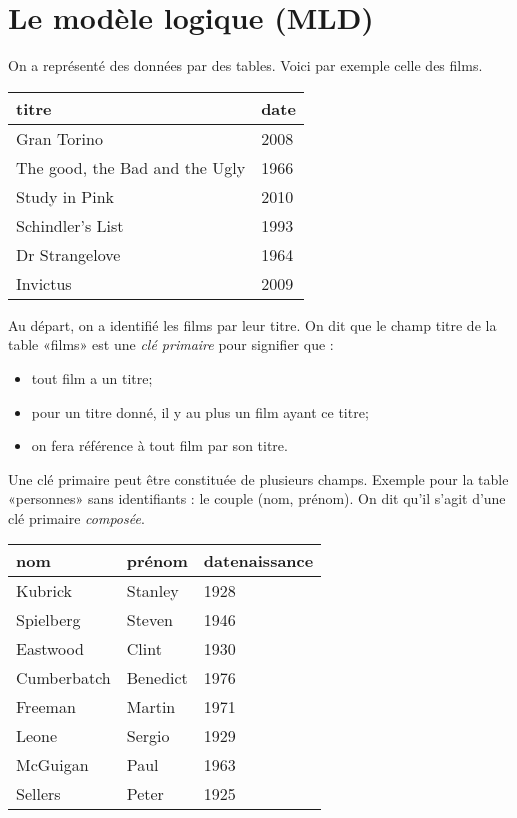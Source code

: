 \section{Le modèle logique (MLD)}

On a représenté des données par des tables. Voici par exemple celle des films.
\begin{center}
\begin{tabular}{ll}
\toprule
  titre & date\\
\midrule
  Gran Torino & 2008\\
  The good, the Bad and the Ugly& 1966\\
  Study in Pink & 2010\\
  Schindler's List& 1993\\
  Dr Strangelove&1964\\
  Invictus& 2009\\
\bottomrule
\end{tabular}
\end{center}

Au départ, on a identifié les films par leur titre. On dit que le
champ titre de la table «films» est une \emph{clé primaire} pour
signifier que :
\begin{itemize}
\item tout film a un titre;
\item pour un titre donné, il y au plus un film ayant ce titre;
\item on fera référence à tout film par son titre.
\end{itemize}
Une clé primaire peut être constituée de plusieurs champs. 
Exemple
pour la table «personnes» sans identifiants :  le couple (nom, prénom). On dit qu'il
s'agit  d'une clé primaire \emph{composée}.

\begin{center}
\begin{tabular}{lll}
\toprule
nom & prénom & datenaissance\\
\midrule
Kubrick&Stanley&1928\\
Spielberg & Steven& 1946\\
Eastwood & Clint& 1930\\
Cumberbatch & Benedict & 1976\\
Freeman & Martin& 1971\\
Leone & Sergio & 1929 \\
McGuigan & Paul & 1963\\
Sellers&Peter&1925\\
\bottomrule
\end{tabular}
\end{center}

